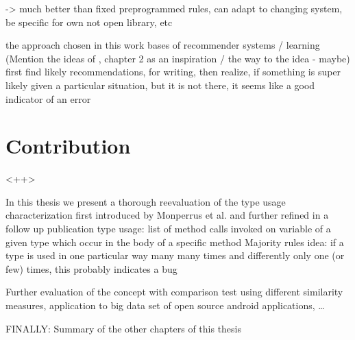 -> much better than fixed preprogrammed rules, can adapt to changing system, be specific for own not open library, etc

the approach chosen in this work bases of recommender systems / learning
(Mention the ideas of \cite{bruch2012ide}, chapter 2 as an inspiration / the way to the idea - maybe)
first find likely recommendations, for writing, then realize, if something is super likely given a particular situation, but it is not there, it seems like a good indicator of an error

\section{Contribution}<++>

In this thesis we present a thorough reevaluation of the type usage characterization first introduced by Monperrus et al.\cite{monperrus2010detecting} and further refined in a follow up publication \cite{monperrus2013detecting}
type usage: list of method calls invoked on variable of a given type which occur in the body of a specific method
Majority rules idea: if a type is used in one particular way many many times and differently only one (or few) times, this probably indicates a bug

Further evaluation of the concept with comparison test using different similarity measures, application to big data set of open source android applications, \ldots

FINALLY: Summary of the other chapters of this thesis
